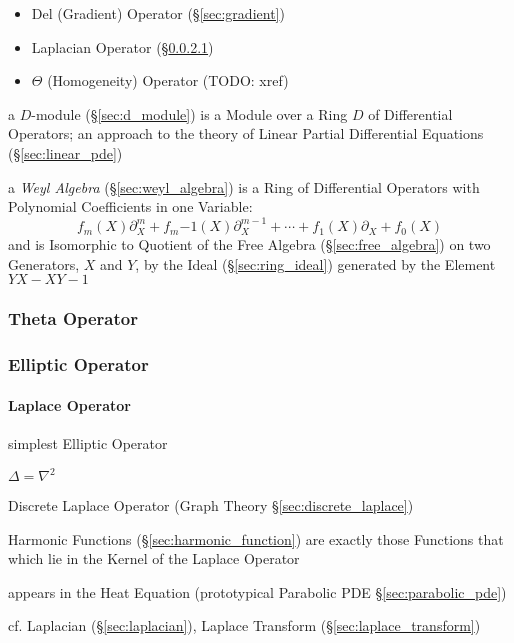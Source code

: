 \begin{itemize}
  \item Del (Gradient) Operator (\S\ref{sec:gradient})
  \item Laplacian Operator (\S\ref{sec:laplace_operator})
  \item $\Theta$ (Homogeneity) Operator (TODO: xref)
\end{itemize}

\fist a $D$-module (\S\ref{sec:d_module}) is a Module over a Ring $D$ of
Differential Operators; an approach to the theory of Linear Partial Differential
Equations (\S\ref{sec:linear_pde})

\fist a \emph{Weyl Algebra} (\S\ref{sec:weyl_algebra}) is a Ring of
Differential Operators with Polynomial Coefficients in one Variable:
\[
  f_m(X)\partial^m_X + f_m{-1}(X)\partial^{m-1}_X + \cdots +
    f_1(X)\partial_X + f_0(X)
\]
and is Isomorphic to Quotient of the Free Algebra (\S\ref{sec:free_algebra}) on
two Generators, $X$ and $Y$, by the Ideal (\S\ref{sec:ring_ideal}) generated by
the Element $YX - XY - 1$



\subsubsection{Theta Operator}\label{sec:theta_operator}

\subsubsection{Elliptic Operator}\label{sec:elliptic_operator}

\paragraph{Laplace Operator}\label{sec:laplace_operator}\hfill

simplest Elliptic Operator

$\Delta = \nabla^2$

Discrete Laplace Operator (Graph Theory \S\ref{sec:discrete_laplace})

Harmonic Functions (\S\ref{sec:harmonic_function}) are exactly those Functions
that which lie in the Kernel of the Laplace Operator

appears in the Heat Equation (prototypical Parabolic PDE
\S\ref{sec:parabolic_pde})

\fist cf. Laplacian (\S\ref{sec:laplacian}), Laplace Transform
(\S\ref{sec:laplace_transform})




